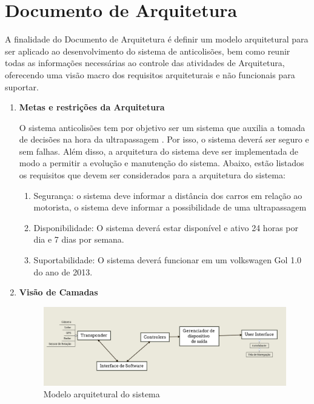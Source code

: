\chapter[Documento de Arquitetura]{Documento de Arquitetura}


A finalidade do Documento de Arquitetura é definir um modelo arquitetural para ser aplicado ao desenvolvimento do sistema de anticolisões, bem como reunir todas as informações necessárias ao controle das atividades de Arquitetura, oferecendo uma visão macro dos requisitos arquiteturais e não funcionais para suportar.

\begin{enumerate}
\item \textbf{Metas e restrições da Arquitetura}

O sistema anticolisões tem por objetivo ser um sistema  que auxilia a tomada de decisões na hora da ultrapassagem . Por isso, o sistema  deverá ser seguro e sem falhas. Além disso, a arquitetura do sistema deve ser implementada de modo a permitir a evolução e manutenção do sistema. Abaixo, estão listados os requisitos que devem ser considerados para a arquitetura do sistema:

\begin{enumerate}
  \item Segurança: o sistema deve informar a distância dos carros em relação ao motorista, o sistema deve informar a possibilidade de uma ultrapassagem
  \item Disponibilidade: O sistema deverá estar disponível e ativo 24 horas por dia e 7 dias por semana.
  \item Suportabilidade: O sistema deverá funcionar em um volkswagen Gol 1.0 do ano de 2013.
\end{enumerate}

\item \textbf{Visão de Camadas}

\begin{figure}[h]
  \centering
  \includegraphics[width=400px, scale=1]{figuras/modelo_arquitetura}
  \caption{Modelo arquitetural do sistema}
\label{fig:modelo_arquitetura}
\end{figure}




\end{enumerate}
